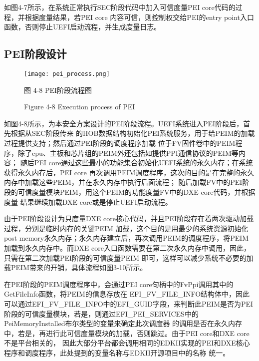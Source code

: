 如图4-7所示，在系统正常执行SEC阶段代码中加入可信度量PEI core代码的过程，并根据度量结果，若PEI core
内容可信，则控制权交给PEI的entry point入口函数，否则停止UEFI启动流程，并生成度量日志。

\subsection{PEI阶段设计}

\begin{figure}[htb]
    \vspace{0cm}   
    \setlength{\abovecaptionskip}{0.3cm}
	\centering
    \texttt{[image: pei\_process.png]}
    \caption*{图 4-8 PEI阶段流程图}
    \setlength{\belowcaptionskip}{-0.7cm}
    \caption*{Figure 4-8 Execution process of PEI}
\end{figure}

如图4-8所示，为本安全方案设计的PEI阶段流程。UEFI系统进入PEI阶段后，首先根据从SEC阶段传来
的HOB数据结构初始化PEI系统服务，用于给PEIM的加载过程提供支持；然后通过PEI阶段的调度程序加载
位于FV固件卷中的PEIM程序，除了cpu、主板和芯片组的PEIM外还包括如提供PPI通信协议的PEIM等内容；
随后PEI core通过这些最小的功能集合初始化UEFI系统的永久内存；在系统获得永久内存后，PEI core
再次调用PEIM调度程序，这次的目的是在完整的永久内存中加载这些PEIM，并在永久内存中执行后面流程；
随后加载FV中的PEI阶段的可信度量模块PEIM，用这个PEIM的功能度量FV中的DXE core代码，并根据度量
结果继续加载DXE core或是停止UEFI启动流程。

\par 由于PEI阶段设计为只度量DXE core核心代码，并且PEI阶段存在着两次驱动加载过程，分别是临时内存的关键PEIM
加载，这个目的是用最少的系统资源初始化post memory永久内存；永久内存建立后，再次调用PEIM的调度程序，将PEIM
加载到永久内存中。而DXE core入口函数需要在第二次永久内存中调用，因此，只需在第二次加载PEI阶段的可信度量PEIM
即可，这样可以减少系统不必要的加载PEIM带来的开销，具体流程如图3-10所示。
\par 在PEI阶段的PEIM调度程序中，会通过PEI core句柄中的FvPpi调用其中的GetFileInfo函数，将PEIM的信息存放在
EFI\_FV\_FILE\_INFO结构体中，因此可以通过EFI\_FV\_FILE\_INFO中的EFI\_GUID字段，来判断此PEIM是否为PEI
阶段的可信度量模块，若是，则通过EFI\_PEI\_SERVICES中的PeiMemoryInstalled布尔类型的变量来确定此次调度器
的调用是否在永久内存中，若是，再进行此可信度量模块的加载，否则跳过。由于PEI core和DXE core不是平台相关的，
因此大部分平台都会调用相同的EDKII实现的PEI和DXE核心程序和调度程序，此处提到的变量名称与EDKII开源项目中的名称
统一。

